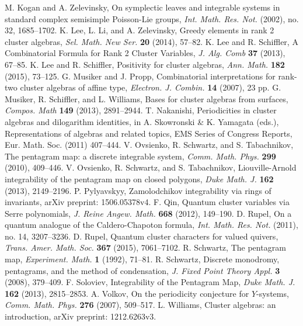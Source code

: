 \documentclass{amsart}
\theoremstyle{definition}
\theoremstyle{remark}
\numberwithin{equation}{section}
\begin{document}
\begin{thebibliography}{99}
  	 M. Kogan and A. Zelevinsky, On symplectic leaves and integrable systems in standard complex semisimple Poisson-Lie groups, \textsl{Int. Math. Res. Not.} (2002), no. 32, 1685--1702.
  	 K. Lee, L. Li, and A. Zelevinsky, Greedy elements in rank 2 cluster algebras, \textsl{Sel. Math. New Ser.} \textbf{20} (2014), 57--82.
  	 K. Lee and R. Schiffler, A Combinatorial Formula for Rank 2 Cluster Variables, \textsl{J. Alg. Comb} \textbf{37} (2013), 67--85.
  	 K. Lee and R. Schiffler, Positivity for cluster algebras, \textsl{Ann. Math.} \textbf{182} (2015), 73--125.
	 G. Musiker and J. Propp, Combinatorial interpretations for rank-two cluster algebras of affine type, \textsl{ Electron. J. Combin.} \textbf{14} (2007), 23 pp.
	 G. Musiker, R. Schiffler, and L. Williams, Bases for cluster algebras from surfaces, \textsl{Compos. Math} \textbf{149} (2013), 2891--2944.
	 T. Nakanishi, Periodicities in cluster algebras and dilogarithm identities, in A. Skowronski \& K. Yamagata (eds.), Representations of algebras and related topics, EMS Series of Congress Reports, Eur. Math. Soc. (2011) 407--444.
	 V. Ovsienko, R. Schwartz, and S. Tabachnikov, The pentagram map: a discrete integrable system, \textsl{Comm. Math. Phys.} \textbf{299} (2010), 409--446.
	 V. Ovsienko, R. Schwartz, and S. Tabachnikov, Liouville-Arnold integrability of the pentagram map on closed polygons, \textsl{Duke Math. J.} \textbf{162} (2013), 2149--2196.
  	 P. Pylyavskyy, Zamolodchikov integrability via rings of invariants, arXiv preprint: 1506.05378v4.
	 F. Qin, Quantum cluster variables via Serre polynomials, \textsl{J. Reine Angew. Math.} \textbf{668} (2012), 149--190.
  	 D. Rupel, On a quantum analogue of the Caldero-Chapoton formula, \textsl{Int. Math. Res. Not.} (2011), no. 14, 3207--3236.
  	 D. Rupel, Quantum cluster characters for valued quivers, \textsl{Trans. Amer. Math. Soc.} \textbf{367} (2015), 7061--7102.
	 R. Schwartz, The pentagram map, \textsl{Experiment. Math.} \textbf{1} (1992), 71--81.
	 R. Schwartz, Discrete monodromy, pentagrams, and the method of condensation, \textsl{J. Fixed Point Theory Appl.} \textbf{3} (2008), 379--409.
	 F. Soloviev, Integrability of the Pentagram Map, \textsl{Duke Math. J.} \textbf{162} (2013), 2815--2853.
	 A. Volkov, On the periodicity conjecture for $Y$-systems, \textsl{Comm. Math. Phys.} \textbf{276} (2007), 509--517.
  	 L. Williams, Cluster algebras: an introduction, arXiv preprint: 1212.6263v3.
\end{thebibliography}

\printindex
\end{document}
